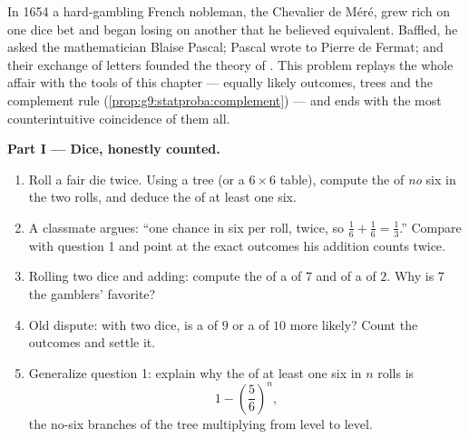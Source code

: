 \begin{problem}
\label{pb:g9:statproba:1}
In 1654 a hard-gambling French nobleman, the Chevalier de
M\'er\'e, grew rich on one dice bet and began losing on another
that he believed equivalent. Baffled, he asked the mathematician
Blaise Pascal; Pascal wrote to Pierre de Fermat; and their
exchange of letters founded the theory of . This
problem replays the whole affair with the tools of this chapter
--- equally likely outcomes, trees and the complement rule
(\cref{prop:g9:statproba:complement}) --- and ends with the most
counterintuitive coincidence of them all.

\medskip
\noindent\textbf{Part I --- Dice, honestly counted.}
\begin{enumerate}
  \item Roll a fair die twice. Using a tree (or a $6 \times 6$
        table), compute the  of \emph{no} six in the
        two rolls, and deduce the  of at least one
        six.
  \item A classmate argues: ``one chance in six per roll, twice,
        so $\frac16 + \frac16 = \frac13$.'' Compare with question
        1 and point at the exact outcomes his addition counts
        twice.
  \item Rolling two dice and adding: compute the  of
        a  of $7$ and of a  of $2$. Why is $7$ the
        gamblers' favorite?
  \item Old dispute: with two dice, is a  of $9$ or a  of
        $10$ more likely? Count the outcomes and settle it.
  \item Generalize question 1: explain why the  of at
        least one six in $n$ rolls is
        \[
        1 - \left(\frac56\right)^{\!n} ,
        \]
        the no-six branches of the tree multiplying from level
        to level.
\end{enumerate}


\end{problem}
